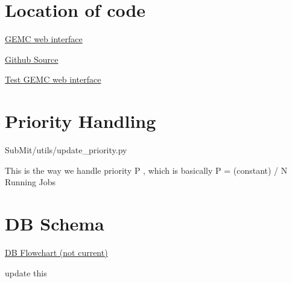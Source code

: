 


\section{Location of code}
\href{https://gemc.jlab.org/web_interface/index.php}{GEMC web interface}

\href{https://github.com/mit-mc-clas12}{Github Source}

\href{https://gemc.jlab.org/test/web_interface/index.php}{Test GEMC web interface}





\section{Priority Handling}


       SubMit/utils/update\_priority.py
    
       This is the way we handle priority P , which is basically P =  (constant) / N Running Jobs
    

\section{DB Schema}
\href{https://dbdiagram.io/d/5c9b829bf7c5bb70c72f6c34}{DB Flowchart (not current)}

update this